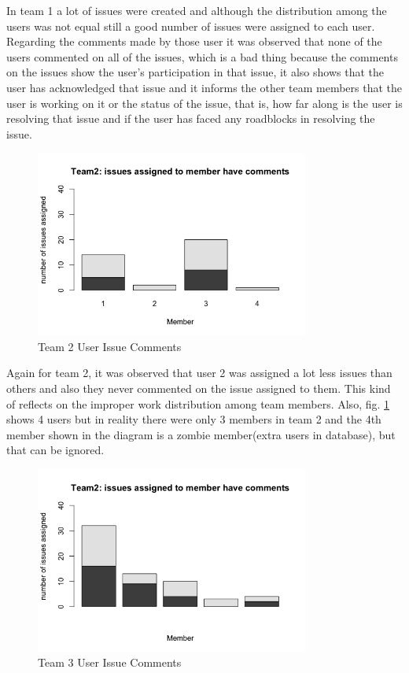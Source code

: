\documentclass[conference]{IEEEtran}
\begin{document}
In team 1 a lot of issues were created and although the distribution among the users was not equal still a good number of issues were assigned to each user. Regarding the comments made by those user it was observed that none of the users commented on all of the issues, which is a bad thing because the comments on the issues show the user's participation in that issue, it also shows that the user has acknowledged that issue and it informs the other team members that the user is working on it or the status of the issue, that is, how far along is the user is resolving that issue and if the user has faced any roadblocks in resolving the issue.

\begin{figure}[H]
    \centering
    \includegraphics[width=9cm]{../AprilProject/pic/team2_user_issue_comments.png}
    \caption{Team 2 User Issue Comments}
    \label{team2_issue_comment}
\end{figure}

Again for team 2, it was observed that user 2 was assigned a lot less issues than others and also they never commented on the issue assigned to them. This kind of reflects on the improper work distribution among team members. Also, fig. \ref{team2_issue_comment} shows 4 users but in reality there were only 3 members in team 2 and the 4th member shown in the diagram is a zombie member(extra users in database), but that can be ignored.

\begin{figure}[H]
    \centering
    \includegraphics[width=9cm]{../AprilProject/pic/team3_user_issue_comments.png}
    \caption{Team 3 User Issue Comments}
    \label{team3_issue_comment}
\end{figure}
\end{document}
